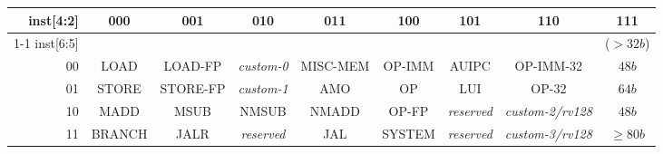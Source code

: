 \vspace{0.1in}
\begin{table*}[htbp]
\begin{center}
{\footnotesize
\setlength{\tabcolsep}{4pt}
\begin{tabular}{|r|c|c|c|c|c|c|c|c|}
  \hline
  inst[4:2] & 000    & 001      & 010            & 011      & 100    & 101            & 110                  & \cellcolor{gray}111 \\ \cline{1-1}
  inst[6:5] &        &          &                &          &        &                &                      & \cellcolor{gray}($>32b$)  \\ \hline
         00 & LOAD   & LOAD-FP  & {\em custom-0} & MISC-MEM & OP-IMM & AUIPC          & OP-IMM-32            & \cellcolor{gray} $48b$\\ \hline
         01 & STORE  & STORE-FP & {\em custom-1} & AMO      & OP     & LUI            & OP-32                & \cellcolor{gray} $64b$ \\ \hline
         10 & MADD   & MSUB     & NMSUB          & NMADD    & OP-FP  & {\em reserved} & {\em custom-2/rv128} & \cellcolor{gray} $48b$\\ \hline
         11 & BRANCH & JALR     & {\em reserved} & JAL      & SYSTEM & {\em reserved} & {\em custom-3/rv128} & \cellcolor{gray} $\geq80b$\\ \hline

 \end{tabular}
}
\end{center}
\vspace{-0.15in}
\caption{RISC-V base opcode map, inst[1:0]=11}
\label{opcodemap}
\end{table*}
